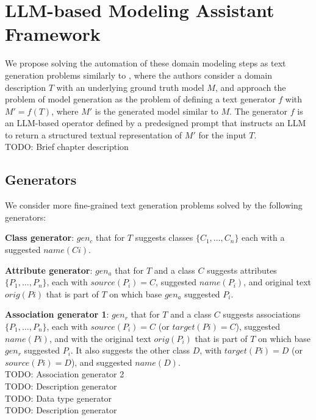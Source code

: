 \chapter{LLM-based Modeling Assistant Framework}

We propose solving the automation of these domain modeling steps as text generation problems similarly to \citet{Chen2023}, where the authors consider a domain description $T$ with an underlying ground truth model $M$, and approach the problem of model generation as the problem of defining a text generator $f$ with $M' = f(T)$, where $M'$ is the generated model similar to $M$. The generator $f$ is an LLM-based operator defined by a predesigned prompt that instructs an LLM to return a structured textual representation of $M'$ for the input $T$. \\

TODO: Brief chapter description


\section{Generators}

We consider more fine-grained text generation problems solved by the following generators:

\textbf{Class generator}: $gen_c$ that for $T$ suggests classes $\{C_1, \ldots, C_n\}$ each with a suggested $name(Ci)$.

\textbf{Attribute generator}: $gen_a$ that for $T$ and a class $C$ suggests attributes $\{P_1, \ldots, P_n\}$, each with $source(P_i) = C$, suggested $name(P_i)$, and original text $orig(Pi)$ that is part of $T$ on which base $gen_a$ suggested $P_i$.

\textbf{Association generator 1}: $gen_r$ that for $T$ and a class $C$ suggests associations $\{P_1, \ldots, P_n\}$, each with $source(P_i) = C$ (or $target(Pi) = C$), suggested $name(Pi)$, and with the original text $orig(P_i)$ that is part of $T$ on which base $gen_r$ suggested $P_i$. It also suggests the other class $D$, with $target(Pi)= D$ (or $source(Pi) = D$), and suggested $name(D)$. \\

TODO: Association generator 2 \\

TODO: Description generator \\

TODO: Data type generator \\

TODO: Description generator \\

